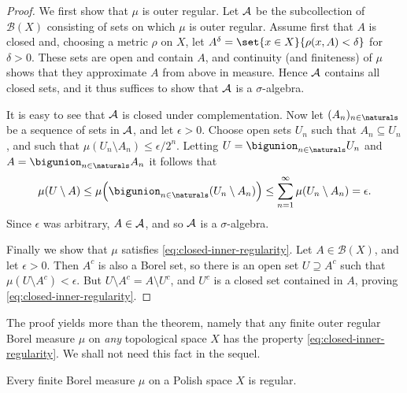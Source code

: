 \documentclass[article, a4paper, 11pt, oneside]{memoir}
\numberwithin{equation}{chapter}
\newcommand{\calB}{\mathcal{B}}
\newcommand{\borel}[1]{\calB(#1)}
\begin{document}
\begin{proof}
    We first show that $\mu$ is outer regular. Let $\mathcal{A}$ be the subcollection of $\borel{X}$ consisting of sets on which $\mu$ is outer regular. Assume first that $A$ is closed and, choosing a metric $\rho$ on $X$, let $A^\delta = \set{x \in X}{\rho(x,A) < \delta}$ for $\delta > 0$. These sets are open and contain $A$, and continuity (and finiteness) of $\mu$ shows that they approximate $A$ from above in measure. Hence $\mathcal{A}$ contains all closed sets, and it thus suffices to show that $\mathcal{A}$ is a $\sigma$-algebra.

    It is easy to see that $\mathcal{A}$ is closed under complementation. Now let $(A_n)_{n \in \naturals}$ be a sequence of sets in $\mathcal{A}$, and let $\epsilon > 0$. Choose open sets $U_n$ such that $A_n \subseteq U_n$, and such that $\mu(U_n \setminus A_n) \leq \epsilon/2^n$. Letting $U = \bigunion_{n \in \naturals} U_n$ and $A = \bigunion_{n \in \naturals} A_n$ it follows that
    \begin{equation*}
        \mu(U \setminus A)
            \leq \mu \Bigl( \bigunion_{n \in \naturals} (U_n \setminus A_n) \Bigr)
            \leq \sum_{n=1}^\infty \mu(U_n \setminus A_n)
            = \epsilon.
    \end{equation*}
    Since $\epsilon$ was arbitrary, $A \in \mathcal{A}$, and so $\mathcal{A}$ is a $\sigma$-algebra.

    Finally we show that $\mu$ satisfies \eqref{eq:closed-inner-regularity}. Let $A \in \borel{X}$, and let $\epsilon > 0$. Then $A^c$ is also a Borel set, so there is an open set $U \supseteq A^c$ such that $\mu(U \setminus A^c) < \epsilon$. But $U \setminus A^c = A \setminus U^c$, and $U^c$ is a closed set contained in $A$, proving \eqref{eq:closed-inner-regularity}.
\end{proof}
%
The proof yields more than the theorem, namely that any finite outer regular Borel measure $\mu$ on \emph{any} topological space $X$ has the property \eqref{eq:closed-inner-regularity}. We shall not need this fact in the sequel.


\begin{lemma}
    \label{thm:Polish-regular}
    Every finite Borel measure $\mu$ on a Polish space $X$ is regular.
\end{lemma}
\end{document}
